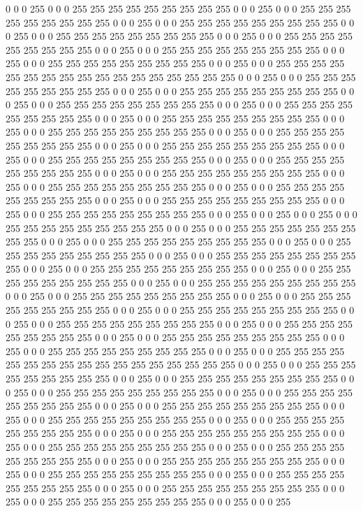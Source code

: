 0 0 0 255 0 0 0 255 255 255 255 255 255 255 255 255 0 0 0 255 0 0 0 255 255 255 255 255 255 255 255 255
0 0 0 255 0 0 0 255 255 255 255 255 255 255 255 255 0 0 0 255 0 0 0 255 255 255 255 255 255 255 255 255
0 0 0 255 0 0 0 255 255 255 255 255 255 255 255 255 0 0 0 255 0 0 0 255 255 255 255 255 255 255 255 255
0 0 0 255 0 0 0 255 255 255 255 255 255 255 255 255 0 0 0 255 0 0 0 255 255 255 255 255 255 255 255 255
255 255 255 255 255 255 255 255 0 0 0 255 0 0 0 255 255 255 255 255 255 255 255 255 0 0 0 255 0 0 0 255
255 255 255 255 255 255 255 255 0 0 0 255 0 0 0 255 255 255 255 255 255 255 255 255 0 0 0 255 0 0 0 255
255 255 255 255 255 255 255 255 0 0 0 255 0 0 0 255 255 255 255 255 255 255 255 255 0 0 0 255 0 0 0 255
255 255 255 255 255 255 255 255 0 0 0 255 0 0 0 255 255 255 255 255 255 255 255 255 0 0 0 255 0 0 0 255
255 255 255 255 255 255 255 255 0 0 0 255 0 0 0 255 255 255 255 255 255 255 255 255 0 0 0 255 0 0 0 255
255 255 255 255 255 255 255 255 0 0 0 255 0 0 0 255 255 255 255 255 255 255 255 255 0 0 0 255 0 0 0 255
255 255 255 255 255 255 255 255 0 0 0 255 0 0 0 255 255 255 255 255 255 255 255 255 0 0 0 255 0 0 0 255
255 255 255 255 255 255 255 255 0 0 0 255 0 0 0 255 255 255 255 255 255 255 255 255 0 0 0 255 0 0 0 255
0 0 0 255 0 0 0 255 255 255 255 255 255 255 255 255 0 0 0 255 0 0 0 255 255 255 255 255 255 255 255 255
0 0 0 255 0 0 0 255 255 255 255 255 255 255 255 255 0 0 0 255 0 0 0 255 255 255 255 255 255 255 255 255
0 0 0 255 0 0 0 255 255 255 255 255 255 255 255 255 0 0 0 255 0 0 0 255 255 255 255 255 255 255 255 255
0 0 0 255 0 0 0 255 255 255 255 255 255 255 255 255 0 0 0 255 0 0 0 255 255 255 255 255 255 255 255 255
0 0 0 255 0 0 0 255 255 255 255 255 255 255 255 255 0 0 0 255 0 0 0 255 255 255 255 255 255 255 255 255
0 0 0 255 0 0 0 255 255 255 255 255 255 255 255 255 0 0 0 255 0 0 0 255 255 255 255 255 255 255 255 255
0 0 0 255 0 0 0 255 255 255 255 255 255 255 255 255 0 0 0 255 0 0 0 255 255 255 255 255 255 255 255 255
0 0 0 255 0 0 0 255 255 255 255 255 255 255 255 255 0 0 0 255 0 0 0 255 255 255 255 255 255 255 255 255
255 255 255 255 255 255 255 255 0 0 0 255 0 0 0 255 255 255 255 255 255 255 255 255 0 0 0 255 0 0 0 255
255 255 255 255 255 255 255 255 0 0 0 255 0 0 0 255 255 255 255 255 255 255 255 255 0 0 0 255 0 0 0 255
255 255 255 255 255 255 255 255 0 0 0 255 0 0 0 255 255 255 255 255 255 255 255 255 0 0 0 255 0 0 0 255
255 255 255 255 255 255 255 255 0 0 0 255 0 0 0 255 255 255 255 255 255 255 255 255 0 0 0 255 0 0 0 255
255 255 255 255 255 255 255 255 0 0 0 255 0 0 0 255 255 255 255 255 255 255 255 255 0 0 0 255 0 0 0 255
255 255 255 255 255 255 255 255 0 0 0 255 0 0 0 255 255 255 255 255 255 255 255 255 0 0 0 255 0 0 0 255
255 255 255 255 255 255 255 255 0 0 0 255 0 0 0 255 255 255 255 255 255 255 255 255 0 0 0 255 0 0 0 255
255 255 255 255 255 255 255 255 0 0 0 255 0 0 0 255 255 255 255 255 255 255 255 255 0 0 0 255 0 0 0 255